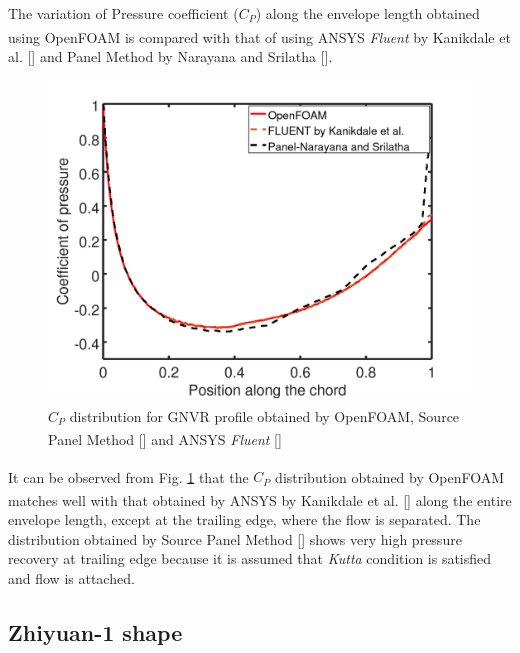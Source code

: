 The variation of Pressure coefficient ($C_{P}$) along the envelope length obtained using OpenFOAM\textsuperscript{\textregistered} is compared with that of using ANSYS\textsuperscript{\textregistered} \textit{Fluent} by Kanikdale et al. [] and Panel Method by Narayana and Srilatha []. 

\begin{figure}[H]
	\centering
	\includegraphics[width=270 pt]{rnd/GNVR_cp.png}
	\caption{$C_{P}$ distribution for GNVR profile obtained by OpenFOAM\textsuperscript{\textregistered}, Source Panel Method [] and ANSYS\textsuperscript{\textregistered} \textit{Fluent} []}
	\label{fig:GNVR pressure distribution} %
\end{figure}

It can be observed from Fig. \ref{fig:GNVR pressure distribution} that the $C_{P}$ distribution obtained by OpenFOAM\textsuperscript{\textregistered} matches well with that obtained by ANSYS\textsuperscript{\textregistered} by Kanikdale et al. [] along the entire envelope length, except at the trailing edge, where the flow is separated. The distribution obtained by Source Panel Method [] shows very high pressure recovery at trailing edge because it is assumed that \textit{Kutta} condition is satisfied and flow is attached.

\subsection{Zhiyuan-1 shape \cite{Wang2010}}

